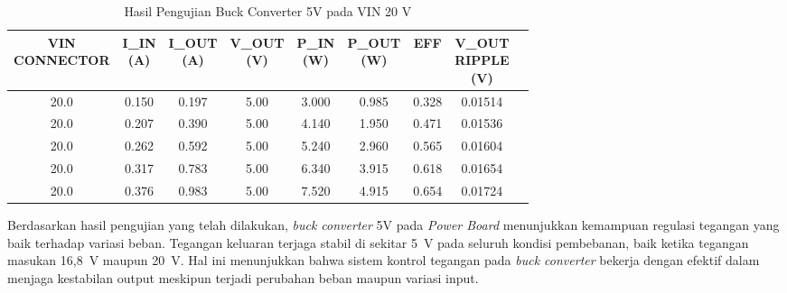 \begin{table}[H]
\centering
\caption{Hasil Pengujian Buck Converter 5V pada VIN 20 V}
\label{tab:buck5v_20v}
\begin{tabular}{ccccccccc}
\hline
\makecell{VIN\\CONNECTOR} & \makecell{I\_IN\\(A)} & \makecell{I\_OUT\\(A)} & \makecell{V\_OUT\\(V)} & \makecell{P\_IN\\(W)} & \makecell{P\_OUT\\(W)} & EFF & \makecell{V\_OUT\\RIPPLE\\(V)} \\
\hline
20.0 & 0.150 & 0.197 & 5.00 & 3.000 & 0.985 & 0.328 & 0.01514 \\
20.0 & 0.207 & 0.390 & 5.00 & 4.140 & 1.950 & 0.471 & 0.01536 \\
20.0 & 0.262 & 0.592 & 5.00 & 5.240 & 2.960 & 0.565 & 0.01604 \\
20.0 & 0.317 & 0.783 & 5.00 & 6.340 & 3.915 & 0.618 & 0.01654 \\
20.0 & 0.376 & 0.983 & 5.00 & 7.520 & 4.915 & 0.654 & 0.01724 \\
\hline
\end{tabular}
\end{table}
Berdasarkan hasil pengujian yang telah dilakukan, \emph{buck converter} 5V pada
\emph{Power Board} menunjukkan kemampuan regulasi tegangan yang baik terhadap
variasi beban. Tegangan keluaran terjaga stabil di sekitar 5~V pada seluruh
kondisi pembebanan, baik ketika tegangan masukan 16,8~V maupun 20~V. Hal ini
menunjukkan bahwa sistem kontrol tegangan pada \emph{buck converter} bekerja
dengan efektif dalam menjaga kestabilan output meskipun terjadi perubahan beban
maupun variasi input.

